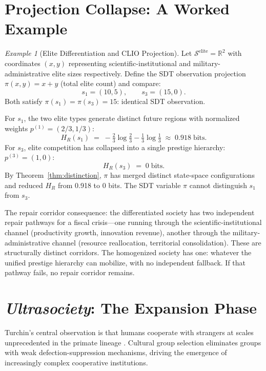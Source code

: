 \documentclass[12pt, a4paper]{article}
\theoremstyle{plain}
\theoremstyle{definition}
\theoremstyle{remark}
\newtheorem{example}{Example}
\begin{document}
\section{Projection Collapse: A Worked Example}
\label{sec:clio}

\begin{example}[Elite Differentiation and CLIO Projection]
\label{ex:elite}
Let $\mathcal{S}^{\mathrm{elite}} = \mathbb{R}^2$ with coordinates $(x,y)$ representing scientific-institutional and military-administrative elite sizes respectively. Define the SDT observation projection $\pi(x,y) = x + y$ (total elite count) and compare:
\[
s_1 = (10, 5), \qquad s_3 = (15, 0).
\]
Both satisfy $\pi(s_1) = \pi(s_3) = 15$: identical SDT observation.

For $s_1$, the two elite types generate distinct future regions with normalized weights $p^{(1)} = (2/3, 1/3)$:
\[
H_R(s_1) \;=\; -\tfrac{2}{3}\log\tfrac{2}{3} - \tfrac{1}{3}\log\tfrac{1}{3} \;\approx\; 0.918 \;\text{bits}.
\]
For $s_3$, elite competition has collapsed into a single prestige hierarchy: $p^{(3)} = (1, 0)$:
\[
H_R(s_3) \;=\; 0 \;\text{bits}.
\]
By Theorem~\ref{thm:distinction}, $\pi$ has merged distinct state-space configurations and reduced $H_R$ from 0.918 to 0 bits. The SDT variable $\pi$ cannot distinguish $s_1$ from $s_3$.

The repair corridor consequence: the differentiated society has two independent repair pathways for a fiscal crisis---one running through the scientific-institutional channel (productivity growth, innovation revenue), another through the military-administrative channel (resource reallocation, territorial consolidation). These are structurally distinct corridors. The homogenized society has one: whatever the unified prestige hierarchy can mobilize, with no independent fallback. If that pathway fails, no repair corridor remains.
\end{example}

\section{\textit{Ultrasociety}: The Expansion Phase}

Turchin's central observation is that humans cooperate with strangers at scales unprecedented in the primate lineage \cite{turchin2016}. Cultural group selection eliminates groups with weak defection-suppression mechanisms, driving the emergence of increasingly complex cooperative institutions.
\end{document}

